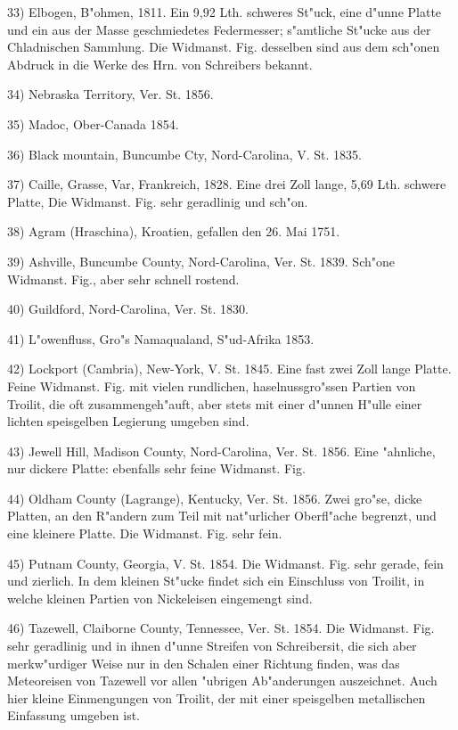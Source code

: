 \documentclass[a4paper, 11pt, oneside]{article}
\begin{document}
33) Elbogen, B"ohmen, 1811. Ein 9,92 Lth. schweres St"uck, eine d"unne Platte und ein aus der Masse geschmiedetes Federmesser; s"amtliche St"ucke aus der Chladnischen Sammlung. Die Widmanst. Fig. desselben sind aus dem sch"onen Abdruck in die Werke des Hrn. von Schreibers bekannt.

34) Nebraska Territory, Ver. St. 1856.

35) Madoc, Ober-Canada 1854.

36) Black mountain, Buncumbe Cty, Nord-Carolina, V. St. 1835.

37) Caille, Grasse, Var, Frankreich, 1828. Eine drei Zoll lange, 5,69 Lth. schwere Platte, Die Widmanst. Fig. sehr geradlinig und sch"on.

38) Agram (Hraschina), Kroatien, gefallen den 26. Mai 1751.

39) Ashville, Buncumbe County, Nord-Carolina, Ver. St. 1839. Sch"one Widmanst. Fig., aber sehr schnell rostend.

40) Guildford, Nord-Carolina, Ver. St. 1830.

41) L"owenfluss, Gro"s Namaqualand, S"ud-Afrika 1853.

42) Lockport (Cambria), New-York, V. St. 1845. Eine fast zwei Zoll lange Platte. Feine Widmanst. Fig. mit vielen rundlichen, haselnussgro"ssen Partien von Troilit, die oft zusammengeh"auft, aber stets mit einer d"unnen H"ulle einer lichten speisgelben Legierung umgeben sind.

43) Jewell Hill, Madison County, Nord-Carolina, Ver. St. 1856. Eine "ahnliche, nur dickere Platte: ebenfalls sehr feine Widmanst. Fig.

44) Oldham County (Lagrange), Kentucky, Ver. St. 1856. Zwei gro"se, dicke Platten, an den R"andern zum Teil mit nat"urlicher Oberfl"ache begrenzt, und eine kleinere Platte. Die Widmanst. Fig. sehr fein.

45) Putnam County, Georgia, V. St. 1854. Die Widmanst. Fig. sehr gerade, fein und zierlich. In dem kleinen St"ucke findet sich ein Einschluss von Troilit, in welche kleinen Partien von Nickeleisen eingemengt sind.

46) Tazewell, Claiborne County, Tennessee, Ver. St. 1854. Die Widmanst. Fig. sehr geradlinig und in ihnen d"unne Streifen von Schreibersit, die sich aber merkw"urdiger Weise nur in den Schalen einer Richtung finden, was das Meteoreisen von Tazewell vor allen "ubrigen Ab"anderungen auszeichnet. Auch hier kleine Einmengungen von Troilit, der mit einer speisgelben metallischen Einfassung umgeben ist.
\vspace{\medskipamount}
\end{document}
